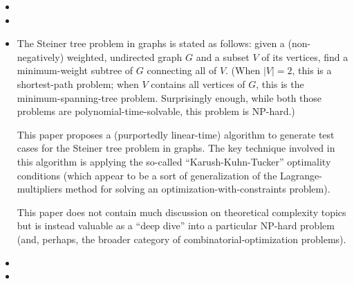 \documentclass{extarticle}
\begin{document}
\begin{itemize}
  \item {}



  \item {}

  \item {}

    \begin{annotation}
      The Steiner tree problem in graphs is stated as follows: given a
      (non-negatively) weighted, undirected graph \(G\) and a subset \(V\) of
      its vertices, find a minimum-weight subtree of \(G\) connecting all of
      \(V\). (When \(\lvert V \rvert = 2\), this is a shortest-path problem;
      when \(V\) contains all vertices of \(G\), this is the
      minimum-spanning-tree problem. Surprisingly enough, while both those
      problems are polynomial-time-solvable, this problem is NP-hard.)

      This paper proposes a (purportedly linear-time) algorithm to generate
      test cases for the Steiner tree problem in graphs.  The key technique
      involved in this algorithm is applying the so-called
      ``Karush-Kuhn-Tucker'' optimality conditions (which appear to be a sort
      of generalization of the Lagrange-multipliers method for solving an
      optimization-with-constraints problem).

      This paper does not contain much discussion on theoretical complexity
      topics but is instead valuable as a ``deep dive'' into a particular
      NP-hard problem (and, perhaps, the broader category of
      combinatorial-optimization problems).
    \end{annotation}

  \item {}

  \item {}

\end{itemize}
\end{document}
